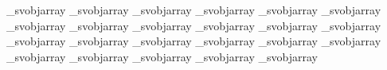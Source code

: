 {{      \fi
      \advance\indexa\cntDeltaBA
      \ifcase\fontdimen\indexa\_svobjarray
        \advance\cntf\@ne
      \fi
      \advance\indexa\cntDeltaBB
      \ifcase\fontdimen\indexa\_svobjarray
        \advance\cntf\@ne
      \fi
      \advance\indexa\cntDeltaBC
      \ifcase\fontdimen\indexa\_svobjarray
        \advance\cntf\@ne
      \fi
      \advance\indexa\cntDeltaBD
      \ifcase\fontdimen\indexa\_svobjarray
        \advance\cntf\@ne
      \fi
      \advance\indexa\cntDeltaBE
      \ifcase\fontdimen\indexa\_svobjarray
        \advance\cntf\@ne
      \fi
      \advance\indexa\cntDeltaBF
      \ifcase\fontdimen\indexa\_svobjarray
        \advance\cntf\@ne
      \fi
      \advance\indexa\cntDeltaBG
      \ifcase\fontdimen\indexa\_svobjarray
        \advance\cntf\@ne
      \fi
      \advance\indexa\cntDeltaBH
      \ifcase\fontdimen\indexa\_svobjarray
        \advance\cntf\@ne
      \fi
      \advance\indexa\cntDeltaCA
      \ifcase\fontdimen\indexa\_svobjarray
        \advance\cntf\@ne
      \fi
      \advance\indexa\cntDeltaCB
      \ifcase\fontdimen\indexa\_svobjarray
        \advance\cntf\@ne
      \fi
      \advance\indexa\cntDeltaCC
      \ifcase\fontdimen\indexa\_svobjarray
        \advance\cntf\@ne
      \fi
      \advance\indexa\cntDeltaCD
      \ifcase\fontdimen\indexa\_svobjarray
        \advance\cntf\@ne
      \fi
      \advance\indexa\cntDeltaCE
      \ifcase\fontdimen\indexa\_svobjarray
        \advance\cntf\@ne
      \fi
      \advance\indexa\cntDeltaCF
      \ifcase\fontdimen\indexa\_svobjarray
        \advance\cntf\@ne
      \fi
      \advance\indexa\cntDeltaCG
      \ifcase\fontdimen\indexa\_svobjarray
        \advance\cntf\@ne
      \fi
      \advance\indexa\cntDeltaCH
      \ifcase\fontdimen\indexa\_svobjarray
        \advance\cntf\@ne
      \fi
      \advance\indexa\cntDeltaDA
      \ifcase\fontdimen\indexa\_svobjarray
        \advance\cntf\@ne
      \fi
      \advance\indexa\cntDeltaDB
      \ifcase\fontdimen\indexa\_svobjarray
        \advance\cntf\@ne
      \fi
      \advance\indexa\cntDeltaDC
      \ifcase\fontdimen\indexa\_svobjarray
        \advance\cntf\@ne
      \fi
      \advance\indexa\cntDeltaDD
      \ifcase\fontdimen\indexa\_svobjarray
        \advance\cntf\@ne
      \fi
      \advance\indexa\cntDeltaDE
      \ifcase\fontdimen\indexa\_svobjarray
        \advance\cntf\@ne
      \fi
      \advance\indexa\cntDeltaDF
      \ifcase\fontdimen\indexa\_svobjarray
        \advance\cntf\@ne
      \fi
      \advance\indexa\cntDeltaDG
      \ifcase\fontdimen\indexa\_svobjarray
        \advance\cntf\@ne
      \fi
      \advance\indexa\cntDeltaDH
}}

